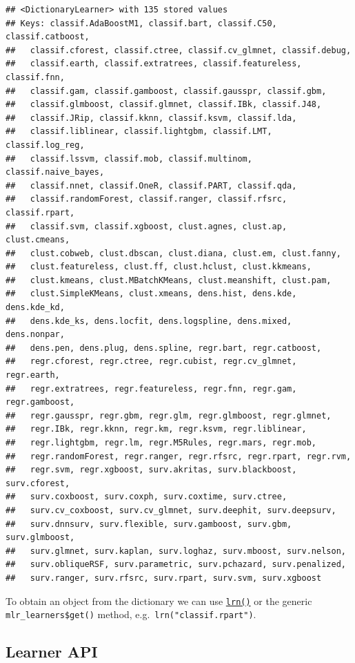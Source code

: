 \documentclass[
]{scrbook}
\begin{document}
\begin{verbatim}
## <DictionaryLearner> with 135 stored values
## Keys: classif.AdaBoostM1, classif.bart, classif.C50, classif.catboost,
##   classif.cforest, classif.ctree, classif.cv_glmnet, classif.debug,
##   classif.earth, classif.extratrees, classif.featureless, classif.fnn,
##   classif.gam, classif.gamboost, classif.gausspr, classif.gbm,
##   classif.glmboost, classif.glmnet, classif.IBk, classif.J48,
##   classif.JRip, classif.kknn, classif.ksvm, classif.lda,
##   classif.liblinear, classif.lightgbm, classif.LMT, classif.log_reg,
##   classif.lssvm, classif.mob, classif.multinom, classif.naive_bayes,
##   classif.nnet, classif.OneR, classif.PART, classif.qda,
##   classif.randomForest, classif.ranger, classif.rfsrc, classif.rpart,
##   classif.svm, classif.xgboost, clust.agnes, clust.ap, clust.cmeans,
##   clust.cobweb, clust.dbscan, clust.diana, clust.em, clust.fanny,
##   clust.featureless, clust.ff, clust.hclust, clust.kkmeans,
##   clust.kmeans, clust.MBatchKMeans, clust.meanshift, clust.pam,
##   clust.SimpleKMeans, clust.xmeans, dens.hist, dens.kde, dens.kde_kd,
##   dens.kde_ks, dens.locfit, dens.logspline, dens.mixed, dens.nonpar,
##   dens.pen, dens.plug, dens.spline, regr.bart, regr.catboost,
##   regr.cforest, regr.ctree, regr.cubist, regr.cv_glmnet, regr.earth,
##   regr.extratrees, regr.featureless, regr.fnn, regr.gam, regr.gamboost,
##   regr.gausspr, regr.gbm, regr.glm, regr.glmboost, regr.glmnet,
##   regr.IBk, regr.kknn, regr.km, regr.ksvm, regr.liblinear,
##   regr.lightgbm, regr.lm, regr.M5Rules, regr.mars, regr.mob,
##   regr.randomForest, regr.ranger, regr.rfsrc, regr.rpart, regr.rvm,
##   regr.svm, regr.xgboost, surv.akritas, surv.blackboost, surv.cforest,
##   surv.coxboost, surv.coxph, surv.coxtime, surv.ctree,
##   surv.cv_coxboost, surv.cv_glmnet, surv.deephit, surv.deepsurv,
##   surv.dnnsurv, surv.flexible, surv.gamboost, surv.gbm, surv.glmboost,
##   surv.glmnet, surv.kaplan, surv.loghaz, surv.mboost, surv.nelson,
##   surv.obliqueRSF, surv.parametric, surv.pchazard, surv.penalized,
##   surv.ranger, surv.rfsrc, surv.rpart, surv.svm, surv.xgboost
\end{verbatim}

To obtain an object from the dictionary we can use \href{https://mlr3.mlr-org.com/reference/mlr_sugar.html}{\texttt{lrn()}} or the generic \texttt{mlr\_learners\$get()} method, e.g.~\texttt{lrn("classif.rpart")}.

\hypertarget{learner-api}{%
\subsection{Learner API}\label{learner-api}}
\end{document}
